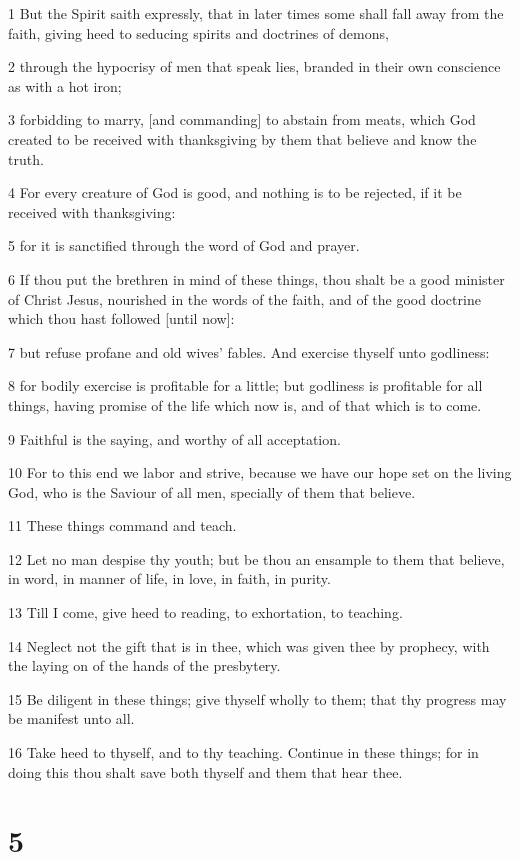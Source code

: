 \par 1 But the Spirit saith expressly, that in later times some shall fall away from the faith, giving heed to seducing spirits and doctrines of demons,
\par 2 through the hypocrisy of men that speak lies, branded in their own conscience as with a hot iron;
\par 3 forbidding to marry, [and commanding] to abstain from meats, which God created to be received with thanksgiving by them that believe and know the truth.
\par 4 For every creature of God is good, and nothing is to be rejected, if it be received with thanksgiving:
\par 5 for it is sanctified through the word of God and prayer.
\par 6 If thou put the brethren in mind of these things, thou shalt be a good minister of Christ Jesus, nourished in the words of the faith, and of the good doctrine which thou hast followed [until now]:
\par 7 but refuse profane and old wives' fables. And exercise thyself unto godliness:
\par 8 for bodily exercise is profitable for a little; but godliness is profitable for all things, having promise of the life which now is, and of that which is to come.
\par 9 Faithful is the saying, and worthy of all acceptation.
\par 10 For to this end we labor and strive, because we have our hope set on the living God, who is the Saviour of all men, specially of them that believe.
\par 11 These things command and teach.
\par 12 Let no man despise thy youth; but be thou an ensample to them that believe, in word, in manner of life, in love, in faith, in purity.
\par 13 Till I come, give heed to reading, to exhortation, to teaching.
\par 14 Neglect not the gift that is in thee, which was given thee by prophecy, with the laying on of the hands of the presbytery.
\par 15 Be diligent in these things; give thyself wholly to them; that thy progress may be manifest unto all.
\par 16 Take heed to thyself, and to thy teaching. Continue in these things; for in doing this thou shalt save both thyself and them that hear thee.

\chapter{5}

